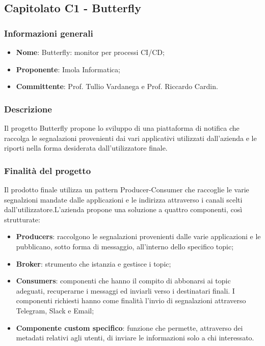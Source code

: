 \subsection{Capitolato C1 - Butterfly}
\subsubsection{Informazioni generali}
\begin{itemize}
	\item \textbf{Nome}: Butterfly: monitor per processi CI/CD;
	\item \textbf{Proponente}: Imola Informatica;
	\item \textbf{Committente}: Prof. Tullio Vardanega e Prof. Riccardo Cardin.
\end{itemize}
\subsubsection{Descrizione}
Il progetto Butterfly propone lo sviluppo di una piattaforma di notifica che raccolga le segnalazioni provenienti dai vari applicativi utilizzati dall’azienda e le riporti nella forma desiderata dall’utilizzatore finale.

\subsubsection{Finalità del progetto}
Il prodotto finale utilizza un pattern Producer-Consumer che raccoglie le varie segnalzioni mandate dalle applicazioni e le indirizza attraverso i canali scelti dall’utilizzatore.L’azienda propone una soluzione a quattro componenti, così strutturate:
\begin{itemize}
	\item \textbf{Producers}: raccolgono le segnalazioni provenienti dalle varie applicazioni e le pubblicano, sotto forma di messaggio, all’interno dello specifico topic;
	\item \textbf{Broker}: strumento che istanzia e gestisce i topic;
	\item \textbf{Consumers}: componenti che hanno il compito di abbonarsi ai topic adeguati, recuperarne i messaggi ed inviarli verso i destinatari finali. I componenti richiesti hanno come finalità l’invio di segnalazioni attraverso Telegram, Slack e Email;
    \item \textbf{Componente custom specifico}: funzione che permette, attraverso dei metadati relativi agli utenti, di inviare le informazioni solo a chi interessato.
\end{itemize}
